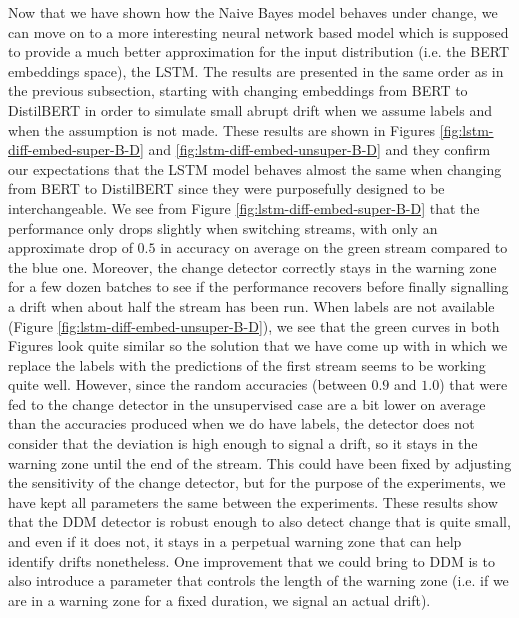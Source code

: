 \documentclass[12pt]{extreport}
\begin{document}
Now that we have shown how the Naive Bayes model behaves under change, we can move on to a more interesting neural network based model which is supposed to provide a much better approximation for the input distribution (i.e. the BERT embeddings space), the LSTM. The results are presented in the same order as in the previous subsection, starting with changing embeddings from BERT to DistilBERT in order to simulate small abrupt drift when we assume labels and when the assumption is not made. These results are shown in Figures \ref{fig:lstm-diff-embed-super-B-D} and \ref{fig:lstm-diff-embed-unsuper-B-D} and they confirm our expectations that the LSTM model behaves almost the same when changing from BERT to DistilBERT since they were purposefully designed to be interchangeable. We see from Figure \ref{fig:lstm-diff-embed-super-B-D} that the performance only drops slightly when switching streams, with only an approximate drop of $0.5$ in accuracy on average on the green stream compared to the blue one. Moreover, the change detector correctly stays in the warning zone for a few dozen batches to see if the performance recovers before finally signalling a drift when about half the stream has been run. When labels are not available (Figure \ref{fig:lstm-diff-embed-unsuper-B-D}), we see that the green curves in both Figures look quite similar so the solution that we have come up with in which we replace the labels with the predictions of the first stream seems to be working quite well. However, since the random accuracies (between $0.9$ and $1.0$) that were fed to the change detector in the unsupervised case are a bit lower on average than the accuracies produced when we do have labels, the detector does not consider that the deviation is high enough to signal a drift, so it stays in the warning zone until the end of the stream. This could have been fixed by adjusting the sensitivity of the change detector, but for the purpose of the experiments, we have kept all parameters the same between the experiments. These results show that the DDM detector is robust enough to also detect change that is quite small, and even if it does not, it stays in a perpetual warning zone that can help identify drifts nonetheless. One improvement that we could bring to DDM is to also introduce a parameter that controls the length of the warning zone (i.e. if we are in a warning zone for a fixed duration, we signal an actual drift).
\end{document}
